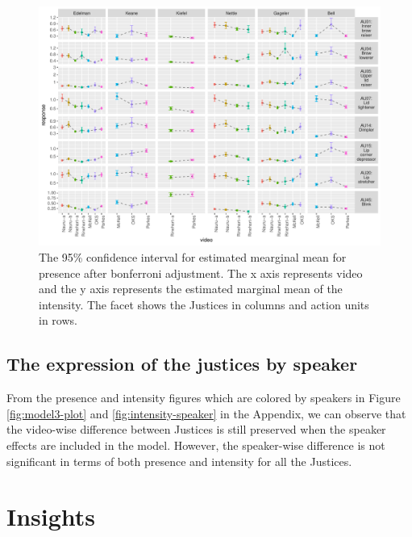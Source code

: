 \documentclass{monashthesis}
\begin{document}
\begin{figure}

{\centering \includegraphics[width=1\linewidth]{figures/intensity-video-1} 

}

\caption{The 95\% confidence interval for estimated mearginal mean for presence after bonferroni adjustment. The x axis represents video and the y axis represents the estimated marginal mean of the intensity. The facet shows the Justices in columns and action units in rows. }\label{fig:intensity-video}
\end{figure}

\hypertarget{the-expression-of-the-justices-by-speaker}{%
\subsection{The expression of the justices by speaker}\label{the-expression-of-the-justices-by-speaker}}

From the presence and intensity figures which are colored by speakers in Figure \ref{fig:model3-plot} and \ref{fig:intensity-speaker} in the Appendix, we can observe that the video-wise difference between Justices is still preserved when the speaker effects are included in the model. However, the speaker-wise difference is not significant in terms of both presence and intensity for all the Justices.

\let\cleardoublepage\clearpage

\hypertarget{insights}{%
\section{Insights}\label{insights}}
\end{document}

